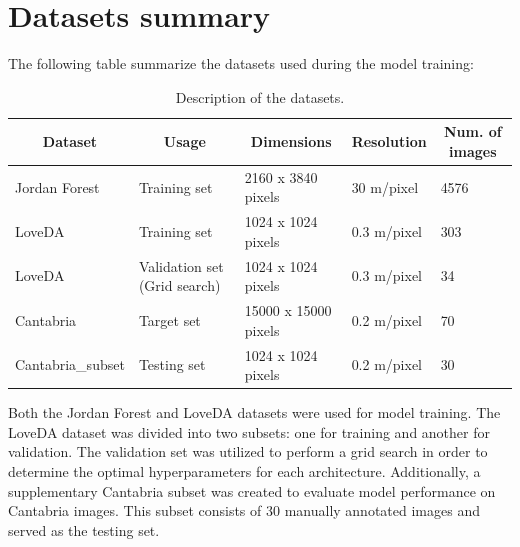 \section{Datasets summary}
The following table summarize the datasets used during the model training:
\begin{table}[H]
\begin{tabular}{|l|l|l|l|l|}
\hline
\multicolumn{1}{|c|}{\textbf{Dataset}} & \multicolumn{1}{c|}{\textbf{Usage}} & \multicolumn{1}{c|}{\textbf{Dimensions}} & \multicolumn{1}{c|}{\textbf{Resolution}} & \multicolumn{1}{c|}{\textbf{Num. of images}} \\ \hline
Jordan Forest                          & Training set                        & 2160 x 3840 pixels                       & 30 m/pixel                               & 4576                                               \\ \hline
LoveDA                                 & Training set                        & 1024 x 1024 pixels                       & 0.3 m/pixel                              & 303                                                \\ \hline
LoveDA                                 & Validation set (Grid search)        & 1024 x 1024 pixels                       & 0.3 m/pixel                              & 34                                                 \\ \hline
Cantabria                              & Target set                          & 15000 x 15000 pixels                     & 0.2 m/pixel                              & 70                                                 \\ \hline
Cantabria\_subset                      & Testing set                         & 1024 x 1024 pixels                       & 0.2 m/pixel                              & 30                                                 \\ \hline
\end{tabular}
\caption{Description of the datasets.}
\label{tab:my-table}
\end{table}

Both the Jordan Forest and LoveDA datasets were used for model training. The LoveDA dataset was divided into two subsets: one for training and another for validation. The validation set was utilized to perform a grid search in order to determine the optimal hyperparameters for each architecture. Additionally, a supplementary Cantabria subset was created to evaluate model performance on Cantabria images. This subset consists of 30 manually annotated images and served as the testing set.

